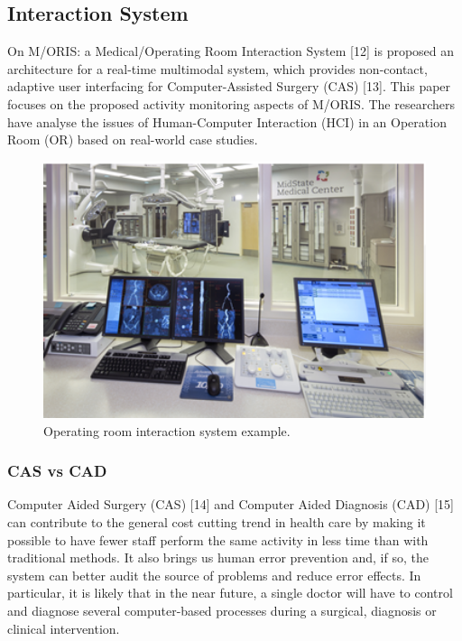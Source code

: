 \subsection{Interaction System}

On M/ORIS: a Medical/Operating Room Interaction System [12] is proposed an architecture for a real-time multimodal system, which provides non-contact, adaptive user interfacing for Computer-Assisted Surgery (CAS) [13]. This paper focuses on the proposed activity monitoring aspects of M/ORIS. The researchers have analyse the issues of Human-Computer Interaction (HCI) in an Operation Room (OR) based on real-world case studies.

\begin{figure}[!hbt]
\centering
\includegraphics[width=1.00\textwidth]{moris.png}
\caption{\label{fig:moris}Operating room interaction system example.
}
\end{figure}

\clearpage

\subsubsection{CAS vs CAD}

Computer Aided Surgery (CAS) [14] and Computer Aided Diagnosis (CAD) [15] can contribute to the general cost cutting trend in health care by making it possible to have fewer staff perform the same activity in less time than with traditional methods. It also brings us human error prevention and, if so, the system can better audit the source of problems and reduce error effects. In particular, it is likely that in the near future, a single doctor will have to control and diagnose several computer-based processes during a surgical, diagnosis or clinical intervention.

